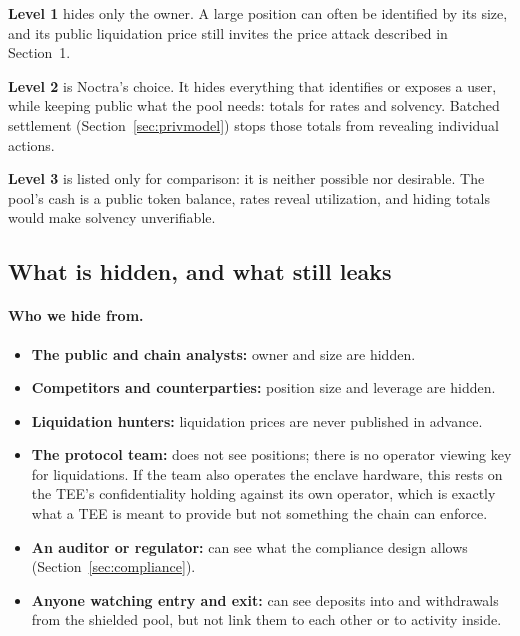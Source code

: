 \documentclass[11pt,a4paper]{article}
\begin{document}
\textbf{Level 1} hides only the owner. A large position can often be identified by its size, and its public
liquidation price still invites the price attack described in Section~1.

\textbf{Level 2} is Noctra's choice. It hides everything that identifies or exposes a user, while keeping public
what the pool needs: totals for rates and solvency. Batched settlement (Section~\ref{sec:privmodel}) stops those
totals from revealing individual actions.

\textbf{Level 3} is listed only for comparison: it is neither possible nor desirable. The pool's cash is a
public token balance, rates reveal utilization, and hiding totals would make solvency unverifiable.

\subsection{What is hidden, and what still leaks}

\paragraph{Who we hide from.}
\begin{itemize}
  \item \textbf{The public and chain analysts:} owner and size are hidden.
  \item \textbf{Competitors and counterparties:} position size and leverage are hidden.
  \item \textbf{Liquidation hunters:} liquidation prices are never published in advance.
  \item \textbf{The protocol team:} does not see positions; there is no operator viewing key for liquidations.
        If the team also operates the enclave hardware, this rests on the TEE's confidentiality holding
        against its own operator, which is exactly what a TEE is meant to provide but not something the
        chain can enforce.
  \item \textbf{An auditor or regulator:} can see what the compliance design allows (Section~\ref{sec:compliance}).
  \item \textbf{Anyone watching entry and exit:} can see deposits into and withdrawals from the shielded pool, but
        not link them to each other or to activity inside.
\end{itemize}
\end{document}
